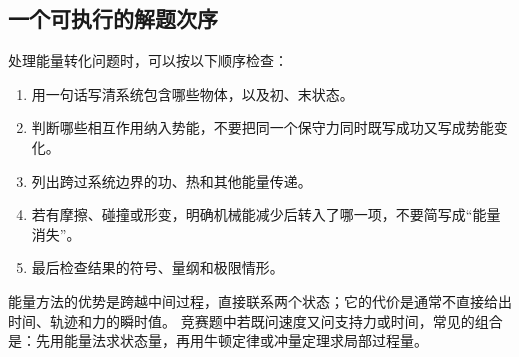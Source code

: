 \subsection{一个可执行的解题次序}\nopagebreak[4]

处理能量转化问题时，可以按以下顺序检查：
\begin{enumerate}[label=\arabic*.,leftmargin=2.2em]
  \item 用一句话写清系统包含哪些物体，以及初、末状态。
  \item 判断哪些相互作用纳入势能，不要把同一个保守力同时既写成功又写成势能变化。
  \item 列出跨过系统边界的功、热和其他能量传递。
  \item 若有摩擦、碰撞或形变，明确机械能减少后转入了哪一项，不要简写成“能量消失”。
  \item 最后检查结果的符号、量纲和极限情形。
\end{enumerate}
\nopagebreak[4]
能量方法的优势是跨越中间过程，直接联系两个状态；它的代价是通常不直接给出时间、轨迹和力的瞬时值。
竞赛题中若既问速度又问支持力或时间，常见的组合是：先用能量法求状态量，再用牛顿定律或冲量定理求局部过程量。
